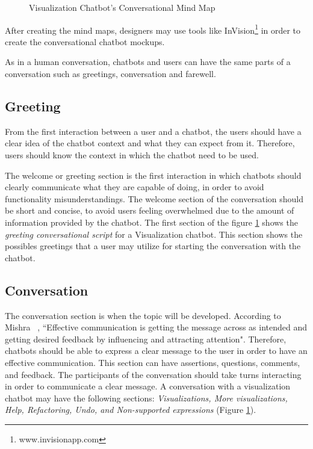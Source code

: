\documentclass[a4paper,10pt]{article}
\begin{document}

\begin{figure}
    \caption{Visualization Chatbot's Conversational Mind Map}
   \label{FigureMindMap}
\end{figure}

After creating the mind maps, designers may use tools like InVision\footnote{www.invisionapp.com} in order to create the conversational chatbot mockups.

As in a human conversation, chatbots and users can have the same parts of a conversation such as greetings,  conversation and farewell.

\subsection{Greeting}
From the first interaction between a user and a chatbot, the users should have a clear idea of the chatbot context and what they can expect from it. Therefore, users should know the context in which the chatbot need to be used.

The welcome or greeting section is the first interaction in which chatbots should clearly communicate what they are capable of doing, in order to avoid functionality misunderstandings. 
The welcome section of the conversation should be short and concise, to avoid users feeling overwhelmed due to the amount of information provided by the chatbot. The first section of the figure \ref{FigureMindMap} shows the \textit{greeting conversational script} for a Visualization chatbot. This section shows the possibles greetings that a user may utilize for starting the conversation with the chatbot.  

\subsection{Conversation}
The conversation section is when the topic will be developed. According to Mishra ~\cite{effectivCommunication}, ``Effective communication is getting the message across as intended and getting desired feedback by influencing and attracting attention". Therefore, chatbots should be able to express a clear message to the user in order to have an effective communication. This section can have assertions, questions, comments, and feedback. The participants of the conversation should take turns interacting in order to communicate a clear message. A conversation with a visualization chatbot may have the following sections: \textit{Visualizations, More visualizations, Help, Refactoring, Undo, and Non-supported expressions} (Figure \ref{FigureMindMap}).
\end{document}
